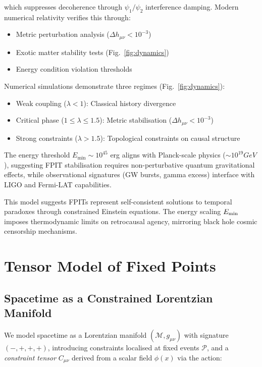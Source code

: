 \documentclass[twocolumn]{article}
\newcommand{\fpit}{\mathcal{P}}
\begin{document}
	
	which suppresses decoherence through $\psi_1/\psi_2$ interference damping. Modern numerical relativity\cite{baumgarte2010,Loffler2012} verifies this through:
	\begin{itemize}
		\item Metric perturbation analysis ($\Delta h_{\mu\nu} < 10^{-3}$)
		\item Exotic matter stability tests (Fig.~\ref{fig:dynamics})
		\item Energy condition violation thresholds\cite{curiel2017}
	\end{itemize}
	
	Numerical simulations demonstrate three regimes (Fig.~\ref{fig:dynamics}):
	\begin{itemize}
		\item Weak coupling ($\lambda < 1$): Classical history divergence
		\item Critical phase ($1 \leq \lambda \leq 1.5$): Metric stabilisation ($\Delta h_{\mu\nu} < 10^{-3}$)
		\item Strong constraints ($\lambda > 1.5$): Topological constraints on causal structure
	\end{itemize}
	The energy threshold $E_{\text{min}} \sim 10^{45}$ erg aligns with Planck-scale physics  ($\sim 10^{19}GeV$)\cite{wheeler1957}, suggesting FPIT stabilisation requires non-perturbative quantum gravitational effects\cite{hossenfelder2013}, while observational signatures (GW bursts, gamma excess) interface with LIGO\cite{ligo2015} and Fermi-LAT\cite{fermilat2009} capabilities.
	
	This model suggests FPITs represent self-consistent solutions to temporal paradoxes through constrained Einstein equations. The energy scaling \(E_{\rm min}\) imposes thermodynamic limits on retrocausal agency, mirroring black hole cosmic censorship mechanisms.
	
	\FloatBarrier%
	\section{Tensor Model of Fixed Points}\label{sec:tensor_model}
	
	\subsection{Spacetime as a Constrained Lorentzian Manifold}\label{subsec:constrained_manifold}
	
	We model spacetime as a Lorentzian manifold \((\mathcal{M}, g_{\mu\nu})\) with signature \((-,+,+,+)\), introducing constraints localised at fixed events \(\fpit\), and a \textit{constraint tensor} \(C_{\mu\nu}\) derived from a scalar field \(\phi(x)\) via the action:
	
\end{document}
